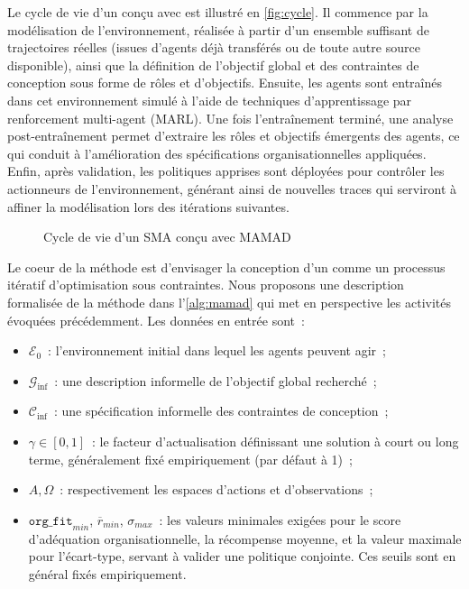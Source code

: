 Le cycle de vie d'un  conçu avec  est illustré en \autoref{fig:cycle}. Il commence par la modélisation de l'environnement, réalisée à partir d'un ensemble suffisant de trajectoires réelles (issues d'agents déjà transférés ou de toute autre source disponible), ainsi que la définition de l'objectif global et des contraintes de conception sous forme de rôles et d'objectifs. Ensuite, les agents sont entraînés dans cet environnement simulé à l'aide de techniques d'apprentissage par renforcement multi-agent (MARL). Une fois l'entraînement terminé, une analyse post-entraînement permet d'extraire les rôles et objectifs émergents des agents, ce qui conduit à l'amélioration des spécifications organisationnelles appliquées. Enfin, après validation, les politiques apprises sont déployées pour contrôler les actionneurs de l'environnement, générant ainsi de nouvelles traces qui serviront à affiner la modélisation lors des itérations suivantes.

\begin{figure}[h!]
  \centering
  
  \caption{Cycle de vie d'un SMA conçu avec MAMAD}
  \label{fig:cycle}
\end{figure}

Le coeur de la méthode  est d'envisager la conception d'un  comme un processus itératif d'optimisation sous contraintes. Nous proposons une description formalisée de la méthode  dans l'\autoref{alg:mamad} qui met en perspective les activités évoquées précédemment. Les données en entrée sont~:
\begin{itemize}
  \item $\mathcal{E}_0$~: l'environnement initial dans lequel les agents peuvent agir~;
  \item $\mathcal{G}_{\text{inf}}$~: une description informelle de l'objectif global recherché~;
  \item $\mathcal{C}_{\text{inf}}$~: une spécification informelle des contraintes de conception~;
  \item $\gamma \in [0,1]$~: le facteur d'actualisation définissant une solution à court ou long terme, généralement fixé empiriquement (par défaut à 1)~;
  \item $A, \Omega$~: respectivement les espaces d'actions et d'observations~;
  \item $\texttt{org\_fit}_{min}$, $\overline{r}_{min}$, $\sigma_{max}$~: les valeurs minimales exigées pour le score d'adéquation organisationnelle, la récompense moyenne, et la valeur maximale pour l'écart-type, servant à valider une politique conjointe. Ces seuils sont en général fixés empiriquement.
\end{itemize}

